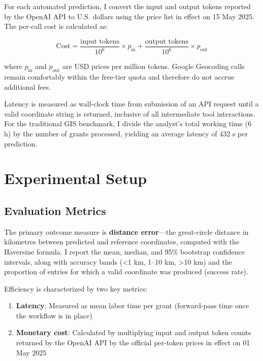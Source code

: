 For each automated prediction, I convert the input and output tokens
reported by the OpenAI API to U.S. dollars using the price list in
effect on 15 May 2025. The per-call cost is calculated as:

\[
\text{Cost} = \frac{\text{input tokens}}{10^{6}} \times p_{\text{in}} + \frac{\text{output tokens}}{10^{6}} \times p_{\text{out}}
\]

where \(p_{\text{in}}\) and \(p_{\text{out}}\) are USD prices per
million tokens. Google Geocoding calls remain comfortably within the
free-tier quota and therefore do not accrue additional fees.

Latency is measured as wall-clock time from submission of an API request
until a valid coordinate string is returned, inclusive of all
intermediate tool interactions. For the traditional GIS benchmark, I
divide the analyst's total working time (6 h) by the number of grants
processed, yielding an average latency of 432 s per prediction.

\section{Experimental Setup}\label{experimental-setup}

\subsection{Evaluation Metrics}\label{evaluation-metrics}

The primary outcome measure is \textbf{distance error}---the
great-circle distance in kilometres between predicted and reference
coordinates, computed with the Haversine formula. I report the mean,
median, and 95\% bootstrap confidence intervals, along with accuracy
bands (\textless1 km, 1--10 km, \textgreater10 km) and the proportion of
entries for which a valid coordinate was produced (success rate).

Efficiency is characterized by two key metrics:

\begin{enumerate}
\def\labelenumi{\arabic{enumi}.}
\tightlist
\item
  \textbf{Latency}: Measured as mean labor time per grant (forward-pass
  time once the workflow is in place)
\item
  \textbf{Monetary cost}: Calculated by multiplying input and output
  token counts returned by the OpenAI API by the official per-token
  prices in effect on 01 May 2025
\end{enumerate}

